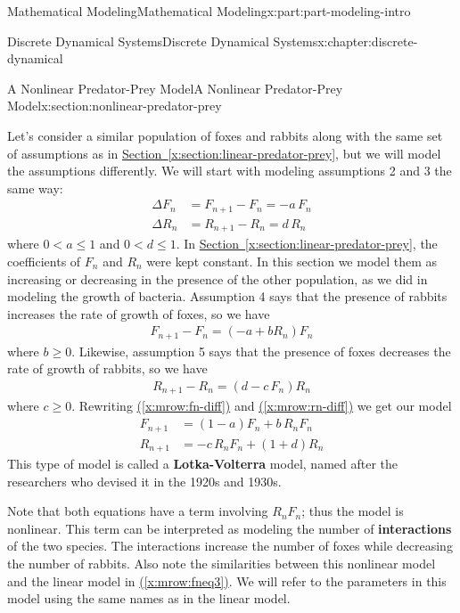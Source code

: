 \documentclass[oneside,10pt,]{book}
\newcommand{\xreffont}{\relax}
\newcommand{\terminology}[1]{\textbf{#1}}
\numberwithin{equation}{section}
\newcommand{\lt}{<}
\newcommand{\amp}{&}
\begin{document}
\begin{partptx}{Mathematical Modeling}{}{Mathematical Modeling}{}{}{x:part:part-modeling-intro}
\begin{chapterptx}{Discrete Dynamical Systems}{}{Discrete Dynamical Systems}{}{}{x:chapter:discrete-dynamical}
%
%
\typeout{************************************************}
\typeout{************************************************}
%
\begin{sectionptx}{A Nonlinear Predator-Prey Model}{}{A Nonlinear Predator-Prey Model}{}{}{x:section:nonlinear-predator-prey}
\begin{introduction}{}%
Let's consider a similar population of foxes and rabbits along with the same set of assumptions as in \hyperref[x:section:linear-predator-prey]{Section~{\xreffont\ref{x:section:linear-predator-prey}}}, but we will model the assumptions differently. We will start with modeling assumptions 2 and 3 the same way:%
%
\begin{align}
\Delta F_n \amp = F_{n+1}-F_n = -a\,F_n \label{x:mrow:fneq4}\\
\Delta R_n \amp = R_{n+1}-R_n = d\,R_n\label{x:mrow:rneq4}
\end{align}
where \(0\lt a\le 1\) and \(0\lt d\le 1\). In \hyperref[x:section:linear-predator-prey]{Section~{\xreffont\ref{x:section:linear-predator-prey}}}, the coefficients of \(F_n\) and \(R_n\) were kept constant. In this section we model them as increasing or decreasing in the presence of the other population, as we did in modeling the growth of bacteria. Assumption 4 says that the presence of rabbits increases the rate of growth of foxes, so we have%
%
\begin{gather}
F_{n+1}-F_n = (-a+bR_n)F_n\label{x:mrow:fn-diff}
\end{gather}
where \(b\ge 0\).  Likewise, assumption 5 says that the presence of foxes decreases the rate of growth of rabbits, so we have%
%
\begin{gather}
R_{n+1} - R_n = (d - c\,F_n)R_n\label{x:mrow:rn-diff}
\end{gather}
where \(c\ge 0\). Rewriting \hyperref[x:mrow:fn-diff]{({\xreffont\ref{x:mrow:fn-diff}})} and \hyperref[x:mrow:rn-diff]{({\xreffont\ref{x:mrow:rn-diff}})} we get our model%
%
\begin{align}
F_{n+1} \amp = (1-a)F_n + b\,R_n F_n\label{x:mrow:flasteq}\\
R_{n+1} \amp = -c\,R_nF_n + (1+d)R_n\label{x:mrow:rlasteq}
\end{align}
This type of model is called a \terminology{Lotka-Volterra} model, named after the researchers who devised it in the 1920s and 1930s.%
\par
Note that both equations have a term involving \(R_nF_n\); thus the model is nonlinear. This term can be interpreted as modeling the number of \terminology{interactions} of the two species.  The interactions increase the number of foxes while decreasing the number of rabbits.  Also note the similarities between this nonlinear model and the linear model in \hyperref[x:mrow:fneq3]{({\xreffont\ref{x:mrow:fneq3}})}.  We will refer to the parameters in this model using the same names as in the linear model.%

\end{introduction}
\end{sectionptx}
\end{chapterptx}
\end{partptx}
\end{document}
